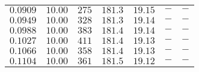 \begin{table}
\begin{tabular}{ccccccc}
$0.0909$ & $10.00$ & $275$ & $181.3$ & $19.15$ & $-$ & $-$ \\

$0.0949$ & $10.00$ & $328$ & $181.3$ & $19.14$ & $-$ & $-$ \\

$0.0988$ & $10.00$ & $383$ & $181.4$ & $19.14$ & $-$ & $-$ \\

$0.1027$ & $10.00$ & $411$ & $181.4$ & $19.13$ & $-$ & $-$ \\

$0.1066$ & $10.00$ & $358$ & $181.4$ & $19.13$ & $-$ & $-$ \\

$0.1104$ & $10.00$ & $361$ & $181.5$ & $19.12$ & $-$ & $-$ \\

\bottomrule
\end{tabular}

\caption{}
\label{tab:1}
\end{table}

